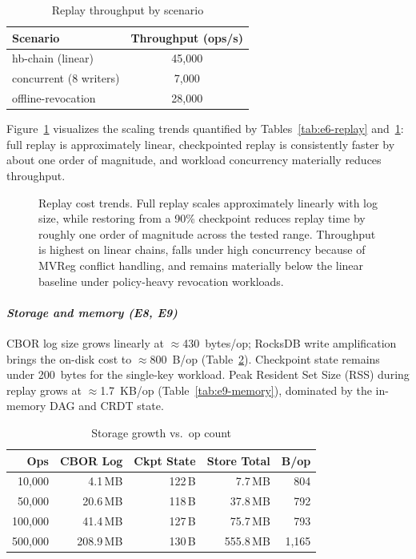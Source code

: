 \documentclass[10pt,journal,compsoc]{IEEEtran}
\begin{document}
\begin{table}[!htbp]
\centering
\caption{Replay throughput by scenario}
\label{tab:e7-throughput}
\begin{tabular}{@{}lc@{}}
\toprule
\textbf{Scenario} & \textbf{Throughput (ops/s)} \\
\midrule
hb-chain (linear)           & 45,000 \\
concurrent (8 writers)      & 7,000  \\
offline-revocation          & 28,000 \\
\bottomrule
\end{tabular}
\end{table}

Figure~\ref{fig:eval-replay-throughput} visualizes the scaling trends quantified by Tables~\ref{tab:e6-replay} and~\ref{tab:e7-throughput}: full replay is approximately linear, checkpointed replay is consistently faster by about one order of magnitude, and workload concurrency materially reduces throughput.

\begin{figure}[!htbp]
\centering

\caption{Replay cost trends. Full replay scales approximately linearly with log size, while restoring from a 90\% checkpoint reduces replay time by roughly one order of magnitude across the tested range. Throughput is highest on linear chains, falls under high concurrency because of MVReg conflict handling, and remains materially below the linear baseline under policy-heavy revocation workloads.}
\label{fig:eval-replay-throughput}
\end{figure}

\paragraph*{\textit{Storage and memory (E8, E9)}}
CBOR log size grows linearly at $\approx$430~bytes/op; RocksDB write amplification brings the on-disk cost to $\approx$800~B/op (Table~\ref{tab:e8-storage}). Checkpoint state remains under 200~bytes for the single-key workload. Peak Resident Set Size (RSS) during replay grows at $\approx$1.7~KB/op (Table~\ref{tab:e9-memory}), dominated by the in-memory DAG and CRDT state.

\begin{table}[!htbp]
\centering
\caption{Storage growth vs.\ op count}
\label{tab:e8-storage}
\begin{tabular}{@{}rrrrr@{}}
\toprule
\textbf{Ops} & \textbf{CBOR Log} & \textbf{Ckpt State} & \textbf{Store Total} & \textbf{B/op} \\
\midrule
10,000  & 4.1\,MB   & 122\,B & 7.7\,MB   & 804 \\
50,000  & 20.6\,MB  & 118\,B & 37.8\,MB  & 792 \\
100,000 & 41.4\,MB  & 127\,B & 75.7\,MB  & 793 \\
500,000 & 208.9\,MB & 130\,B & 555.8\,MB & 1,165 \\
\bottomrule
\end{tabular}
\end{table}
\end{document}
